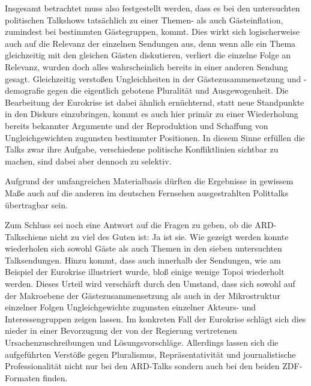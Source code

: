 Insgesamt betrachtet muss also festgestellt werden, dass es bei den  untersuchten politischen Talkshows tatsächlich zu einer Themen- als auch Gästeinflation, zumindest bei bestimmten Gästegruppen, kommt. Dies wirkt sich logischerweise auch auf die Relevanz der einzelnen Sendungen aus, denn wenn alle ein Thema gleichzeitig mit den gleichen Gästen diskutieren, verliert die einzelne Folge an Relevanz, wurden doch alles wahrscheinlich bereits in einer anderen Sendung gesagt. Gleichzeitig verstoßen Ungleichheiten in der Gästezusammensetzung und -demografie gegen die eigentlich gebotene Pluralität und Ausgewogenheit. Die Bearbeitung der Eurokrise ist dabei ähnlich ernüchternd, statt neue Standpunkte in den Diskurs einzubringen, kommt es auch hier primär zu einer Wiederholung bereits bekannter Argumente und der Reproduktion und Schaffung von Ungleichgewichten zugunsten bestimmter Positionen. In diesem Sinne erfüllen die Talks zwar ihre Aufgabe, verschiedene politische Konfliktlinien sichtbar zu machen, sind dabei aber dennoch zu selektiv.

Aufgrund der umfangreichen Materialbasis dürften die Ergebnisse in gewissem Maße auch auf die anderen im deutschen Fernsehen ausgestrahlten Polittalks übertragbar sein.

Zum Schluss sei noch eine Antwort auf die Fragen zu geben, ob die ARD-Talkschiene nicht zu viel des Guten ist: Ja ist sie. Wie gezeigt werden konnte wiederholen sich sowohl Gäste als auch Themen in den sieben untersuchten Talksendungen. Hinzu kommt, dass auch innerhalb der Sendungen, wie am Beispiel der Eurokrise illustriert wurde, bloß einige wenige Topoi wiederholt werden. Dieses Urteil wird verschärft durch den Umstand, dass sich sowohl auf der Makroebene der Gästezusammensetzung als auch in der Mikrostruktur einzelner Folgen Ungleichgewichte zugunsten einzelner Akteurs- und Interessengruppen zeigen lassen. Im konkreten Fall der Eurokrise schlägt sich dies nieder in einer Bevorzugung der von der Regierung vertretenen Ursachenzuschreibungen und Lösungsvorschläge. Allerdings lassen sich die aufgeführten Verstöße gegen Pluralismus, Repräsentativität und journalistische Professionalität nicht nur bei den ARD-Talks sondern auch bei den beiden ZDF-Formaten finden.

